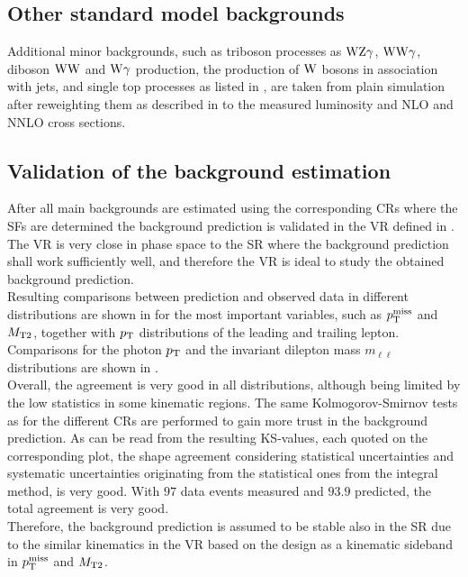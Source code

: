 


\subsection{Other standard model backgrounds}
Additional minor backgrounds, such as triboson processes as $\mathrm{W}\mathrm{Z}\gamma$, $\mathrm{W}\mathrm{W}\gamma$, diboson $\mathrm{W}\mathrm{W}$ and $\mathrm{W}\gamma$ production, the production of $\mathrm{W}$ bosons in association with jets, and single top processes as listed in , are taken from plain simulation after reweighting them as described in  to the measured luminosity and NLO and NNLO cross sections.

\FloatBarrier
\subsection{Validation of the background estimation}\label{sec:Validation}
After all main backgrounds are estimated using the corresponding CRs where the SFs are determined the background prediction is validated in the VR defined in . The VR is very close in phase space to the SR where the background prediction shall work sufficiently well, and therefore the VR is ideal to study the obtained background prediction.\\
Resulting comparisons between prediction and observed data in different distributions are shown in  for the most important variables, such as $p_{\mathrm{T}}^\text{miss}$ and $M_{\mathrm{T2}}$, together with $p_{\mathrm{T}}$ distributions of the leading and trailing lepton. Comparisons for the photon $p_{\mathrm{T}}$ and the invariant dilepton mass $m_{\ell\ell}$ distributions are shown in .\\
Overall, the agreement is very good in all distributions, although being limited by the low statistics in some kinematic regions. The same Kolmogorov-Smirnov tests as for the different CRs are performed to gain more trust in the background prediction. As can be read from the resulting KS-values, each quoted on the corresponding plot, the shape agreement considering statistical uncertainties and systematic uncertainties originating from the statistical ones from the integral method, is very good. With $97$ data events measured and $93.9$ predicted, the total agreement is very good.\\
Therefore, the background prediction is assumed to be stable also in the SR due to the similar kinematics in the VR based on the design as a kinematic sideband in $p_{\mathrm{T}}^\text{miss}$ and $M_{\mathrm{T2}}$.
